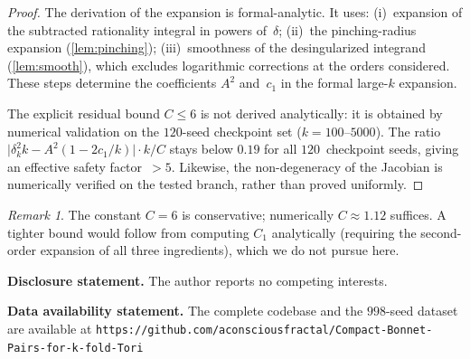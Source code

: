 \documentclass[11pt,a4paper]{article}
\theoremstyle{plain}
\theoremstyle{definition}
\theoremstyle{remark}
\newtheorem{remark}[theorem]{Remark}
\begin{document}
\begin{proof}
  The derivation of the expansion is formal-analytic.
  It uses: (i)~expansion of the subtracted rationality integral
  in powers of~$\delta$; (ii)~the pinching-radius expansion
  (\cref{lem:pinching}); (iii)~smoothness of the desingularized
  integrand (\cref{lem:smooth}), which excludes logarithmic
  corrections at the orders considered.
  These steps determine the coefficients $A^2$ and~$c_1$ in the
  formal large-$k$ expansion.

  The explicit residual bound $C \le 6$ is not derived analytically:
  it is obtained by numerical validation on the $120$-seed
  checkpoint set ($k = 100$--$5000$).
  The ratio $\lvert \delta_k^2 k - A^2(1-2c_1/k) \rvert \cdot k/C$
  stays below $0.19$ for all $120$~checkpoint seeds,
  giving an effective safety factor~$> 5$.
  Likewise, the non-degeneracy of the Jacobian is numerically
  verified on the tested branch, rather than proved uniformly.
\end{proof}

\begin{remark}
  The constant $C = 6$ is conservative; numerically
  $C \approx 1.12$ suffices.  A tighter bound would follow from
  computing $C_1$ analytically (requiring the second-order
  expansion of all three ingredients), which we do not pursue here.
\end{remark}

\bigskip
\noindent\textbf{Disclosure statement.}
The author reports no competing interests.

\smallskip
\noindent\textbf{Data availability statement.}
The complete codebase and the $998$-seed dataset are available at
\texttt{https://github.com/aconsciousfractal/Compact-Bonnet-Pairs-for-k-fold-Tori}

\end{document}

